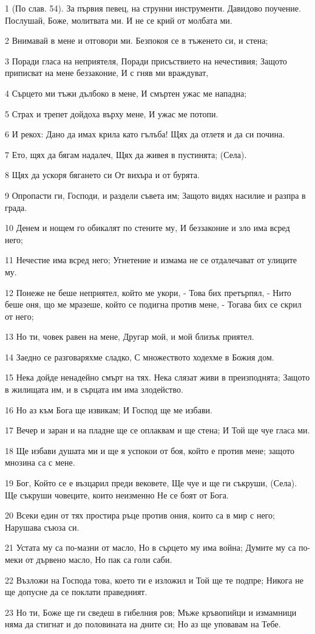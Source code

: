 \par 1 (По слав. 54). За първия певец, на струнни инструменти. Давидово поучение. Послушай, Боже, молитвата ми. И не се крий от молбата ми.
\par 2 Внимавай в мене и отговори ми. Безпокоя се в тъженето си, и стена;
\par 3 Поради гласа на неприятеля, Поради присъствието на нечестивия; Защото приписват на мене беззаконие, И с гняв ми враждуват,
\par 4 Сърцето ми тъжи дълбоко в мене, И смъртен ужас ме нападна;
\par 5 Страх и трепет дойдоха върху мене, И ужас ме потопи.
\par 6 И рекох: Дано да имах крила като гълъба! Щях да отлетя и да си почина.
\par 7 Ето, щях да бягам надалеч, Щях да живея в пустинята; (Села).
\par 8 Щях да ускоря бягането си От вихъра и от бурята.
\par 9 Опропасти ги, Господи, и раздели съвета им; Защото видях насилие и разпра в града.
\par 10 Денем и нощем го обикалят по стените му, И беззаконие и зло има всред него;
\par 11 Нечестие има всред него; Угнетение и измама не се отдалечават от улиците му.
\par 12 Понеже не беше неприятел, който ме укори, - Това бих претърпял, - Нито беше оня, що ме мразеше, който се подигна против мене, - Тогава бих се скрил от него;
\par 13 Но ти, човек равен на мене, Другар мой, и мой близък приятел.
\par 14 Заедно се разговаряхме сладко, С множеството ходехме в Божия дом.
\par 15 Нека дойде ненадейно смърт на тях. Нека слязат живи в преизподнята; Защото в жилищата им, и в сърцата им има злодейство.
\par 16 Но аз към Бога ще извикам; И Господ ще ме избави.
\par 17 Вечер и заран и на пладне ще се оплаквам и ще стена; И Той ще чуе гласа ми.
\par 18 Ще избави душата ми и ще я успокои от боя, който е против мене; защото мнозина са с мене.
\par 19 Бог, Който се е възцарил преди вековете, Ще чуе и ще ги съкруши, (Села). Ще съкруши човеците, които неизменно Не се боят от Бога.
\par 20 Всеки един от тях простира ръце против ония, които са в мир с него; Нарушава съюза си.
\par 21 Устата му са по-мазни от масло, Но в сърцето му има война; Думите му са по-меки от дървено масло, Но пак са голи саби.
\par 22 Възложи на Господа това, което ти е изложил и Той ще те подпре; Никога не ще допусне да се поклати праведният.
\par 23 Но ти, Боже ще ги сведеш в гибелния ров; Мъже кръвопийци и измамници няма да стигнат и до половината на дните си; Но аз ще уповавам на Тебе.

